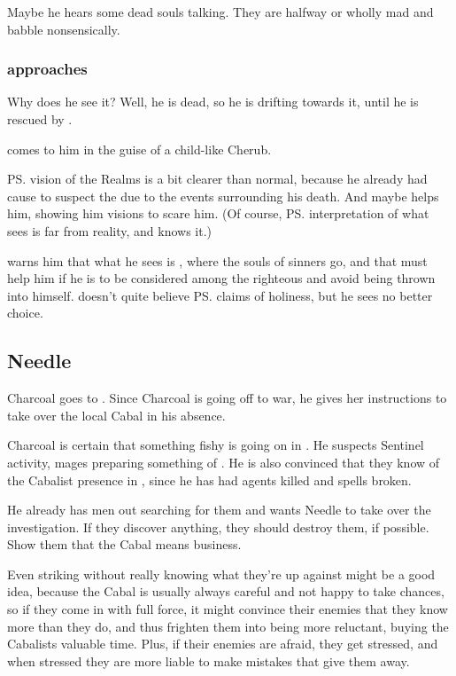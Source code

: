 Maybe he hears some dead souls talking. They are halfway or wholly mad and babble nonsensically. 






\subsubsection{\Psyrex{} approaches \Icor}
Why does he see it? 
Well, he is dead, so he is drifting towards it, until he is rescued by \Psyrex. 

\Psyrex{} comes to him in the guise of a child-like Cherub. 
 
\ps{\Icor} vision of the Realms is a bit clearer than normal, because he already had cause to suspect the \Sephiroth{} due to the events surrounding his death. 
And maybe \Psyrex{} helps him, showing him visions to scare him. 
(Of course, \ps{\Psyrex}{} interpretation of what \Icor{} sees is far from reality, and \Psyrex{} knows it.)

\Psyrex{} warns him that what he sees is \Itzach, where the souls of sinners go, and that \Icor{} must help him if he is to be considered among the righteous and avoid being thrown into \Itzach{} himself. 
\Icor{} doesn't quite believe \ps{\Psyrex}{} claims of holiness, but he sees no better choice. 







\subsection{Needle}
Charcoal goes to . Since Charcoal is going off to war, he gives her instructions to take over the local Cabal in his absence. 

Charcoal is certain that something fishy is going on in \Malcur. He suspects Sentinel activity, mages preparing something of . He is also convinced that they know of the Cabalist presence in \Malcur, since he has had agents killed and spells broken. 

He already has men out searching for them and wants Needle to take over the investigation. If they discover anything, they should destroy them, if possible. Show them that the Cabal means business. 

Even striking without really knowing what they're up against might be a good idea, because the Cabal is usually always careful and not happy to take chances, so if they come in with full force, it might convince their enemies that they know more than they do, and thus frighten them into being more reluctant, buying the Cabalists valuable time. Plus, if their enemies are afraid, they get stressed, and when stressed they are more liable to make mistakes that give them away. 

